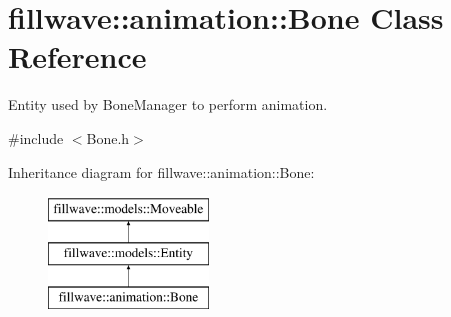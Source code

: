 \hypertarget{classfillwave_1_1animation_1_1Bone}{}\section{fillwave\+:\+:animation\+:\+:Bone Class Reference}
\label{classfillwave_1_1animation_1_1Bone}


Entity used by Bone\+Manager to perform animation.  




{\ttfamily \#include $<$Bone.\+h$>$}

Inheritance diagram for fillwave\+:\+:animation\+:\+:Bone\+:\begin{figure}[H]
\begin{center}
\leavevmode
\includegraphics[height=3.000000cm]{classfillwave_1_1animation_1_1Bone}
\end{center}
\end{figure}
